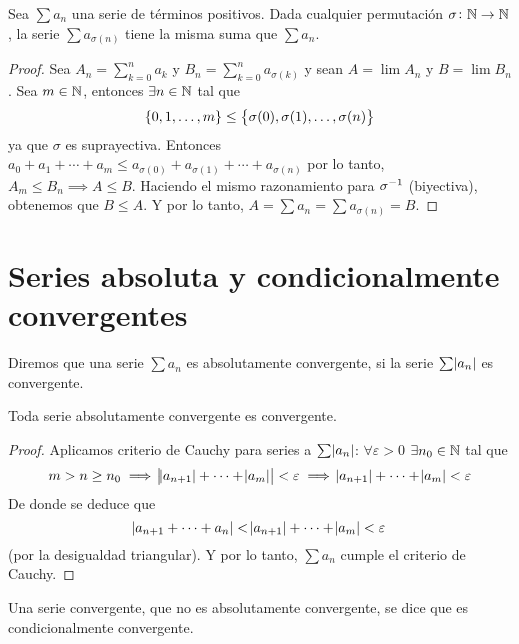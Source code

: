 \begin{prop}
	Sea $\sum a_n$ una serie de términos positivos. Dada cualquier permutación $\sigma
	\colon \mathbb{N} \to \mathbb{N}$, la serie $\sum a_{\sigma(n)}$ tiene la misma suma que $\sum a_n$.
\end{prop}

\begin{proof}
	Sea $A_n = \sum\limits_{k=0}^n a_k$ y $B_n = \sum\limits_{k=0}^n a_{\sigma(k)}$ y sean
	$A = \lim A_n$ y $B = \lim B_n$. Sea
	$m \in \mathbb{N}$, entonces $\exists n \in \mathbb{N}$ tal que
	\[
		\left\{0,1, \dots, m\right\} \leq \left\{\sigma(0), \sigma(1), \dots, \sigma(n)\right\}
	\]
	ya que $\sigma$ es suprayectiva. Entonces $a_0 + a_1 + \cdots + a_m \leq a_{\sigma(0)} +
	a_{\sigma(1)} + \cdots + a_{\sigma(n)}$ por lo tanto, $A_m \leq B_n \implies A \leq B$.
	Haciendo el mismo razonamiento para $\sigma^{-1}$ (biyectiva), obtenemos que $B \leq A$.
	Y por lo tanto, $A = \sum a_n = \sum a_{\sigma(n)} = B$.
\end{proof}

\section{Series absoluta y condicionalmente convergentes}

\begin{defi}
  Diremos que una serie $\sum a_n$ es absolutamente convergente, si la serie $\sum \abs{a_n}$ es convergente.
\end{defi}

\begin{prop}
  Toda serie absolutamente convergente es convergente.
\end{prop}

\begin{proof}
  Aplicamos criterio de Cauchy para series a $\sum \abs{a_n}$: $\forall \varepsilon > 0$ $\exists n_0 \in \mathbb{N}$
  tal que
  \[
    m > n \geq n_0 \implies \abs{\abs{a_{n+1}} + \cdots + \abs{a_m}} < \varepsilon \implies
    \abs{a_{n+1}} + \cdots + \abs{a_m} < \varepsilon
  \]
  De donde se deduce que
  \[
    \abs{a_{n+1} + \cdots + a_n} < \abs{a_{n+1}} + \cdots + \abs{a_m} < \varepsilon
  \]
  (por la desigualdad triangular). Y por lo tanto, $\sum a_n$ cumple el criterio de Cauchy.

\end{proof}

\begin{defi}
  Una serie convergente, que no es absolutamente convergente, se dice que es condicionalmente convergente.
\end{defi}

